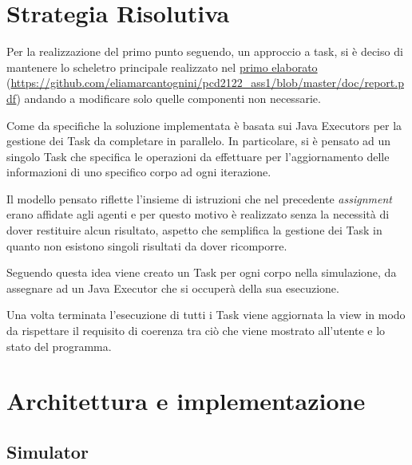 \section{Strategia Risolutiva}

Per la realizzazione del primo punto seguendo, un approccio a task, si è deciso di mantenere lo scheletro principale realizzato nel \href{https://github.com/eliamarcantognini/pcd2122_ass1/blob/master/doc/report.pdf}{primo elaborato} (\url{https://github.com/eliamarcantognini/pcd2122_ass1/blob/master/doc/report.pdf}) andando a modificare solo quelle componenti non necessarie.

Come da specifiche la soluzione implementata è basata sui Java Executors per la gestione dei Task da completare in parallelo.
%
In particolare, si è pensato ad un singolo Task che specifica le operazioni da effettuare per l'aggiornamento delle informazioni di uno specifico corpo ad ogni iterazione.

Il modello pensato riflette l'insieme di istruzioni che nel precedente \textit{assignment} erano affidate agli agenti e per questo motivo è realizzato senza la necessità di dover restituire alcun risultato, aspetto che semplifica la gestione dei Task in quanto non esistono singoli risultati da dover ricomporre.

Seguendo questa idea viene creato un Task per ogni corpo nella simulazione, da assegnare ad un Java Executor che si occuperà della sua esecuzione.

Una volta terminata l'esecuzione di tutti i Task viene aggiornata la view in modo da rispettare il requisito di coerenza tra ciò che viene mostrato all'utente e lo stato del programma.

\section{Architettura e implementazione}
\label{section:arch_impl}

\subsection{Simulator}
\label{subs:simulator}

